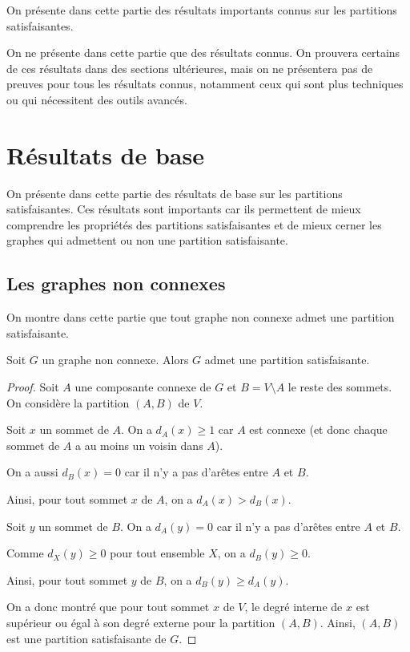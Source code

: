 On présente dans cette partie des résultats importants connus sur les partitions satisfaisantes.

On ne présente dans cette partie que des résultats connus.
On prouvera certains de ces résultats dans des sections ultérieures, mais on ne présentera pas de preuves pour tous les résultats connus, notamment ceux qui sont plus techniques ou qui nécessitent des outils avancés.



\section{Résultats de base}\label{sec:s_4}

On présente dans cette partie des résultats de base sur les partitions satisfaisantes.
Ces résultats sont importants car ils permettent de mieux comprendre les propriétés des partitions satisfaisantes et de mieux cerner les graphes qui admettent ou non une partition satisfaisante.

\subsection{Les graphes non connexes}\label{subsec:ss4_1}

On montre dans cette partie que tout graphe non connexe admet une partition satisfaisante.

\begin{proposition}\label{prop:4_1_1}
    Soit \(G\) un graphe non connexe.
    Alors \(G\) admet une partition satisfaisante.
\end{proposition}

\begin{proof}
    Soit \(A\) une composante connexe de \(G\) et \(B = V \setminus A\) le reste des sommets.
    On considère la partition \((A, B)\) de \(V\).

    Soit \(x\) un sommet de \(A\). 
    On a \(d_A(x) \geq 1\) car \(A\) est connexe (et donc chaque sommet de \(A\) a au moins un voisin dans \(A\)).

    On a aussi \(d_B(x) = 0\) car il n'y a pas d'arêtes entre \(A\) et \(B\).
    
    Ainsi, pour tout sommet \(x\) de \(A\), on a \(d_A(x) > d_B(x)\).

    Soit \(y\) un sommet de \(B\). 
    On a \(d_A(y) = 0\) car il n'y a pas d'arêtes entre \(A\) et \(B\).
    
    Comme \(d_X(y) \geq 0\) pour tout ensemble \(X\), on a \(d_B(y) \geq 0\).

    Ainsi, pour tout sommet \(y\) de \(B\), on a \(d_B(y) \geq d_A(y)\).

    On a donc montré que pour tout sommet \(x\) de \(V\), le degré interne de \(x\) est supérieur ou égal à son degré externe pour la partition \((A, B)\).
    Ainsi, \((A, B)\) est une partition satisfaisante de \(G\).
\end{proof}

